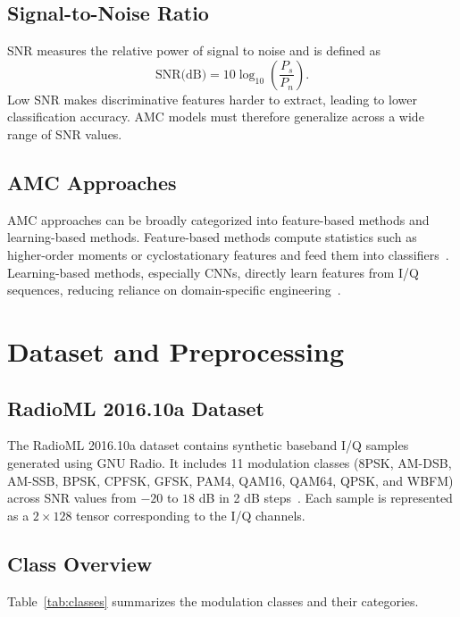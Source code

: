 \documentclass[12pt,a4paper]{report}
\begin{document}
\section{Signal-to-Noise Ratio}
SNR measures the relative power of signal to noise and is defined as
\begin{equation}
    \text{SNR(dB)} = 10\log_{10}\left(\frac{P_s}{P_n}\right).
\end{equation}
Low SNR makes discriminative features harder to extract, leading to lower classification accuracy. AMC models must therefore generalize across a wide range of SNR values.

\section{AMC Approaches}
AMC approaches can be broadly categorized into feature-based methods and learning-based methods. Feature-based methods compute statistics such as higher-order moments or cyclostationary features and feed them into classifiers~\cite{gardner1988}. Learning-based methods, especially CNNs, directly learn features from I/Q sequences, reducing reliance on domain-specific engineering~\cite{oshea2016cnn,lecun1998}.

\chapter{Dataset and Preprocessing}
\section{RadioML 2016.10a Dataset}
The RadioML 2016.10a dataset contains synthetic baseband I/Q samples generated using GNU Radio. It includes 11 modulation classes (8PSK, AM-DSB, AM-SSB, BPSK, CPFSK, GFSK, PAM4, QAM16, QAM64, QPSK, and WBFM) across SNR values from \(-20\) to \(18\) dB in 2 dB steps~\cite{oshea2016dataset}. Each sample is represented as a $2 \times 128$ tensor corresponding to the I/Q channels.

\section{Class Overview}
Table~\ref{tab:classes} summarizes the modulation classes and their categories.
\end{document}
